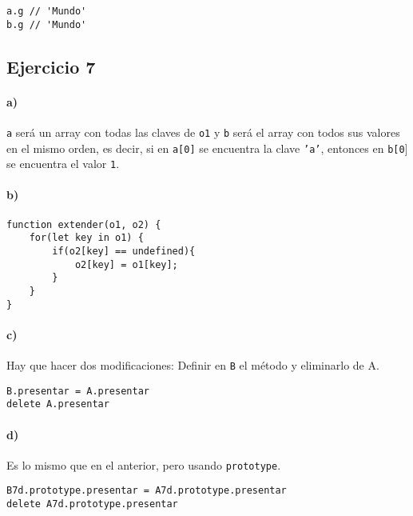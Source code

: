 \documentclass[10pt,a4paper]{article}
\begin{document}
\begin{centrado}
\begin{verbatim}
a.g // 'Mundo'
b.g // 'Mundo'
\end{verbatim}
\end{centrado}

\subsection{Ejercicio 7}
\paragraph{a)} \texttt{a} será un array con todas las claves de \texttt{o1} y \texttt{b} será el array con todos sus valores en el mismo orden, es decir, si en \texttt{a[0]} se encuentra la clave \texttt{'a'}, entonces en \texttt{b[0}] se encuentra el valor \texttt{1}.

\paragraph{b)}
\begin{centrado}
\begin{verbatim}
function extender(o1, o2) {
    for(let key in o1) {
        if(o2[key] == undefined){
            o2[key] = o1[key];
        }
    }
}
\end{verbatim}
\end{centrado}

\paragraph{c)} Hay que hacer dos modificaciones: Definir en \texttt{B} el método y eliminarlo de A.
\begin{centrado}
\begin{verbatim}
B.presentar = A.presentar
delete A.presentar
\end{verbatim}
\end{centrado}

\paragraph{d)} Es lo mismo que en el anterior, pero usando \texttt{prototype}.
\begin{centrado}
\begin{verbatim}
B7d.prototype.presentar = A7d.prototype.presentar
delete A7d.prototype.presentar
\end{verbatim}
\end{centrado}
\end{document}

